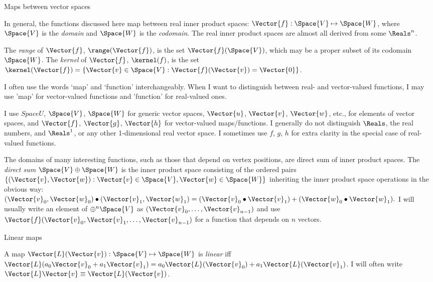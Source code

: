 \begin{plSection}{Maps between vector spaces}
\label{sec:maps}

In general, the functions discussed here map 
between real inner product spaces:
$\Vector{f}:\Space{V} \mapsto \Space{W}$, where $\Space{V}$ is the
{\it domain} and $\Space{W}$ is the {\it codomain}.
The real inner product spaces are almost all 
derived from some $\Reals^n$.

The {\it range} of $\Vector{f}$, $\range(\Vector{f})$, is the set 
$\Vector{f}(\Space{V})$,
which may be a proper subset of its codomain $\Space{W}$.
The {\it kernel} of $\Vector{f}$, $\kernel(f)$, is the set
$\kernel(\Vector{f}) = \left\{ \Vector{v} \in \Space{V} : 
\Vector{f}(\Vector{v}) = \Vector{0} \right\}$.

I often use the words `map' and `function' interchangeably.
When I want to distinguish between real- and vector-valued functions,
I may use 'map' for vector-valued functions and
'function' for real-valued ones.

I use $Space{U}$, $\Space{V}$, $\Space{W}$ for generic vector spaces,
$\Vector{u}$, $\Vector{v}$, $\Vector{w}$, etc., for elements of vector spaces,
and
$\Vector{f}$, $\Vector{g}$, $\Vector{h}$ for vector-valued maps/functions.
I generally do not distinguish $\Reals$, the real numbers,
and $\Reals^1$, or any other 1-dimensional real vector space.
I sometimes use $f$, $g$, $h$ for extra clarity in the special
case of real-valued functions.

The domains of many interesting functions,
such as those that depend on vertex positions,
are direct sum of inner product spaces.
The {\it direct sum} $\Space{V} \oplus \Space{W}$ is 
the inner product space
consisting of the ordered pairs $\left\{ (\Vector{v},\Vector{w}) : 
\Vector{v} \in \Space{V}, \Vector{w} \in \Space{W} \right\}$
inheriting the inner product space operations in the obvious way:
$(\Vector{v}_0,\Vector{w}_0) \bullet (\Vector{v}_1,\Vector{w}_1) = 
(\Vector{v}_0 \bullet \Vector{v}_1) + (\Vector{w}_0 \bullet \Vector{w}_1).$
I will usually write an element of $\oplus^n \Space{V}$ as
$(\Vector{v}_0,\ldots,\Vector{v}_{n-1})$
and use
$\Vector{f}(\Vector{v}_0,\Vector{v}_1,\ldots,\Vector{v}_{n-1})$
for a function that depends on $n$ vectors.

\begin{plSection}{Linear maps}
\label{sec:linear-maps}

A map $\Vector{L}(\Vector{v}):\Space{V} \mapsto \Space{W}$
is {\it linear} iff
$\Vector{L}(a_0 \Vector{v}_0 + a_1 \Vector{v}_1) = a_0 \Vector{L}(\Vector{v}_0) + a_1 \Vector{L}(\Vector{v}_1)$.
I will often write $\Vector{L}\Vector{v} \equiv \Vector{L}(\Vector{v})$.


\end{plSection}
\end{plSection}
